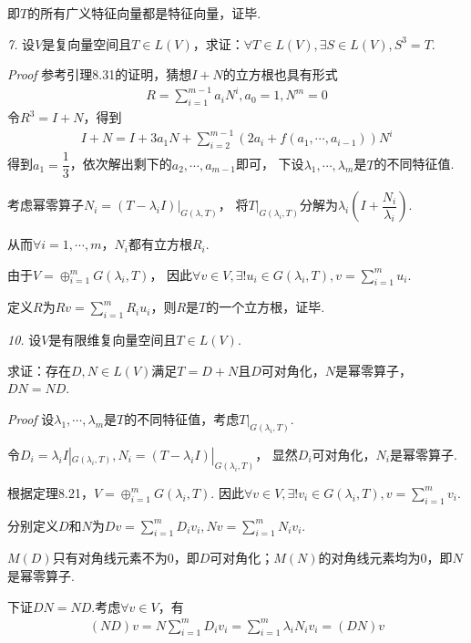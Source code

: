 即\(T\)的所有广义特征向量都是特征向量，证毕.

\hspace*{\fill}

\textit{7.}
设\(V\)是复向量空间且\(T \in L(V)\)，求证：\(\forall T \in L(V),\exists S \in L(V),S^3=T\).

\textit{Proof}
参考引理8.31的证明，猜想\(I+N\)的立方根也具有形式
    \begin{align*}
        R=\sum_{i=1}^{m-1} a_iN^i,a_0=1,N^m=0
    \end{align*}
令\(R^3=I+N\)，得到
    \begin{align*}
        I+N=I+3a_1N+\sum_{i=2}^{m-1} (2a_i+f(a_1,\cdots,a_{i-1}))N^i
    \end{align*}
得到\(a_1=\dfrac{1}{3}\)，依次解出剩下的\(a_2,\cdots,a_{m-1}\)即可，
下设\(\lambda_1,\cdots,\lambda_m\)是\(T\)的不同特征值.

考虑幂零算子\(N_i=(T-\lambda_i I)|_{G(\lambda,T)}\)，
将\(T|_{G(\lambda_i,T)}\)分解为\(\lambda_i(I+\dfrac{N_i}{\lambda_i})\).

从而\(\forall i=1,\cdots,m\)，\(N_i\)都有立方根\(R_i\).

由于\(V=\oplus_{i=1}^m G(\lambda_i,T)\)，
因此\(\forall v \in V,\exists! u_i \in G(\lambda_i,T),v=\sum_{i=1}^m u_i\).

定义\(R\)为\(Rv=\sum_{i=1}^m R_iu_i\)，则\(R\)是\(T\)的一个立方根，证毕.

\newpage

\textit{10.}
设\(V\)是有限维复向量空间且\(T \in L(V)\).

求证：存在\(D,N \in L(V)\)满足\(T=D+N\)且\(D\)可对角化，\(N\)是幂零算子，\(DN=ND\).

\textit{Proof}
设\(\lambda_1,\cdots,\lambda_m\)是\(T\)的不同特征值，考虑\(T|_{G(\lambda_i,T)}\).

令\(D_i=\lambda_i I|_{G(\lambda_i,T)},N_i=(T-\lambda_i I)|_{G(\lambda_i,T)}\)，
显然\(D_i\)可对角化，\(N_i\)是幂零算子.

根据定理8.21，\(V=\oplus_{i=1}^m G(\lambda_i,T)\).
因此\(\forall v \in V,\exists! v_i \in G(\lambda_i,T),v=\sum_{i=1}^m v_i\).

分别定义\(D\)和\(N\)为\(Dv=\sum_{i=1}^m D_iv_i,Nv=\sum_{i=1}^m N_iv_i\).

\(M(D)\)只有对角线元素不为\(0\)，即\(D\)可对角化；\(M(N)\)的对角线元素均为\(0\)，即\(N\)是幂零算子.

下证\(DN=ND\).考虑\(\forall v \in V\)，有
    \begin{align*}
        (ND)v=N\sum_{i=1}^m D_iv_i=\sum_{i=1}^m \lambda_iN_iv_i=(DN)v
    \end{align*}


